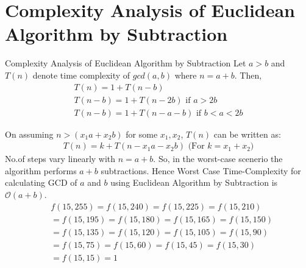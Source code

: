 \documentclass[8pt]{beamer}
\begin{document}
\section{Complexity Analysis of Euclidean Algorithm by Subtraction}
\begin{frame}{Complexity Analysis of Euclidean Algorithm by Subtraction}
Let $a > b$ and $T(n)$ denote time complexity of $gcd(a,b)$ where $n = a+b$. Then,
\begin{align}
T(n) = 1 + T(n-b)\\
T(n-b) = 1 + T(n-2b) \text{ if $a > 2b$}\\
T(n-b) = 1 + T(n-a-b) \text{ if $b < a < 2b$}
\end{align}

On assuming $n > (x_{1}a + x_{2}b)$ for some $x_{1}, x_{2}$, $T(n)$ can be written as:
\begin{align}
T(n) = k + T(n - x_{1}a - x_{2}b) \text{ (For $k = x_{1} + x_{2}$)}
\end{align}
No.of steps vary linearly with $n=a+b$. So, in the worst-case scenerio the algorithm performs $a+b$ subtractions. Hence Worst Case Time-Complexity for calculating GCD of $a$ and  $b$ using Euclidean Algorithm by Subtraction is $\mathcal{O}(a + b)$.\\

\[
\begin{split}
&f(15,255) = f(15,240) = f(15,225) = f(15,210)\\
&= f(15,195) = f(15,180) = f(15,165) = f(15,150)\\
&= f(15,135) = f(15,120) = f(15,105) = f(15,90)\\
&= f(15,75) = f(15,60) = f(15,45) = f(15,30)\\
&= f(15,15) = 1
\end{split}\]

\end{frame}
\end{document}
